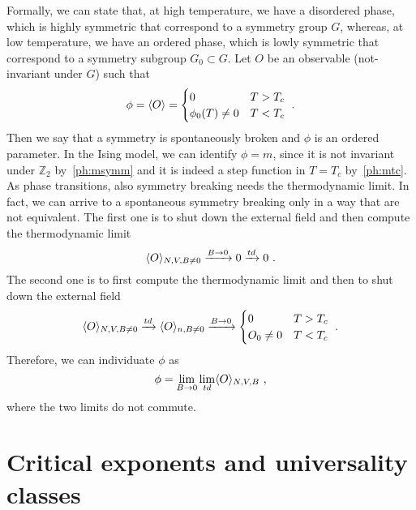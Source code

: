     Formally, we can state that, at high temperature, we have a disordered phase, which is highly symmetric that correspond to a symmetry group $G$, whereas, at low temperature, we have an ordered phase, which is lowly symmetric that correspond to a symmetry subgroup $G_0 \subset G$. Let $O$ be an observable (not-invariant under $G$) such that 
    \begin{equation*}
        \phi = \langle O\rangle = \begin{cases}
            0 & T > T_c \\
            \phi_0 (T) \neq 0 & T < T_c \\
        \end{cases} ~.
    \end{equation*}
    Then we say that a symmetry is spontaneously broken and $\phi$ is an ordered parameter. In the Ising model, we can identify $\phi = m$, since it is not invariant under $\mathbb Z_2$ by~\eqref{ph:msymm} and it is indeed a step function in $T = T_c$ by~\eqref{ph:mtc}.
    As phase transitions, also symmetry breaking needs the thermodynamic limit. In fact, we can arrive to a spontaneous symmetry breaking only in a way that are not equivalent. The first one is to shut down the external field and then compute the thermodynamic limit 
    \begin{equation*}
        \langle O\rangle_{N, V, B \neq 0} \xrightarrow{B \rightarrow 0} 0 \xrightarrow{td} 0 ~.
    \end{equation*}
    The second one is to first compute the thermodynamic limit and then to shut down the external field 
    \begin{equation*}
        \langle O\rangle_{N, V, B \neq 0} \xrightarrow{td} \langle O\rangle_{n, B \neq 0} \xrightarrow{B \rightarrow 0} \begin{cases}
            0 & T > T_c \\
            O_0 \neq 0 & T < T_c \\
        \end{cases} ~.
    \end{equation*}
    Therefore, we can individuate $\phi$ as 
    \begin{equation*}
        \phi = \lim_{B \rightarrow 0} \lim_{td} \langle O\rangle_{N, V, B} ~,
    \end{equation*}
    where the two limits do not commute.

\section{Critical exponents and universality classes}

